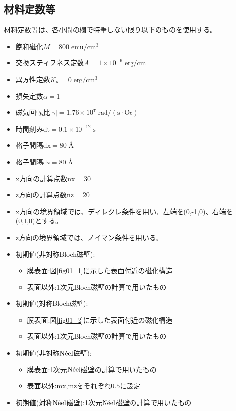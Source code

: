 \documentclass{jsarticle}
\begin{document}
\subsection{材料定数等}
材料定数等は、各小問の欄で特筆しない限り以下のものを使用する。
\begin{itemize}
	\item 飽和磁化$M = 800\;\mathrm{emu/cm^3}$
	\item 交換スティフネス定数$A = 1\times 10^{-6}\;\mathrm{erg/cm}$
	\item 異方性定数$K_u = 0\;\mathrm{erg/cm^3}$
	\item 損失定数$\alpha = 1$
	\item 磁気回転比$\lvert\gamma\rvert = 1.76\times 10^7\;\mathrm{rad/(s\cdot Oe)}$
	\item 時間刻み$\mathrm{dt} = 0.1\times 10^{-12}\;\mathrm{s}$
	\item 格子間隔$\mathrm{dx} = 80\;$\AA
	\item 格子間隔$\mathrm{dz} = 80\;$\AA
	\item x方向の計算点数$\mathrm{nx} = 30$
	\item z方向の計算点数$\mathrm{nz} = 20$
	\item x方向の境界領域では、ディレクレ条件を用い、左端を(0,-1,0)、右端を(0,1,0)とする。
	\item z方向の境界領域では、ノイマン条件を用いる。
	\item 初期値(非対称Bloch磁壁):
	\begin{itemize}
		\item 膜表面:図\ref{fig01_1}に示した表面付近の磁化構造
		\item 表面以外:1次元Bloch磁壁の計算で用いたもの
	\end{itemize}
	\item 初期値(対称Bloch磁壁):
	\begin{itemize}
		\item 膜表面:図\ref{fig01_2}に示した表面付近の磁化構造
		\item 表面以外:1次元Bloch磁壁の計算で用いたもの
	\end{itemize}
	\item 初期値(非対称$\mathrm{N\Acute{e}el}$磁壁):
	\begin{itemize}
		\item 膜表面:1次元$\mathrm{N\Acute{e}el}$磁壁の計算で用いたもの
		\item 表面以外:mx,mzをそれぞれ0.5に設定
	\end{itemize}
	\item 初期値(対称$\mathrm{N\Acute{e}el}$磁壁):1次元$\mathrm{N\Acute{e}el}$磁壁の計算で用いたもの
\end{itemize}
\end{document}
